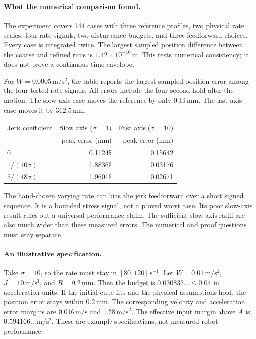 \documentclass[11pt]{article}
\begin{document}
\paragraph{What the numerical comparison found.}
The experiment covers 144 cases with three reference profiles, two physical rate scales, four rate signals, two disturbance budgets, and three feedforward choices. Every case is integrated twice. The largest sampled position difference between the coarse and refined runs is $1.42\times10^{-10}\,\mathrm m$.
This tests numerical consistency; it does not prove a continuous-time envelope.

For $W=0.0005\,\mathrm{m/s^2}$, the table reports the largest sampled position error among the four tested rate signals. All errors include the four-second hold after the motion.
The slow-axis case moves the reference by only $0.16\,\mathrm{mm}$.
The fast-axis case moves it by $312.5\,\mathrm{mm}$.
\begin{center}
\begin{tabular}{lrr}
\toprule
Jerk coefficient & Slow axis ($\sigma=1$) & Fast axis ($\sigma=10$)\\
 & peak error (mm) & peak error (mm)\\
\midrule
$0$ & 0.11245 & 0.15642\\
$1/(10\sigma)$ & 1.88368 & 0.03176\\
$5/(48\sigma)$ & 1.96018 & 0.02671\\
\bottomrule
\end{tabular}
\end{center}
The hand-chosen varying rate can bias the jerk feedforward over a short signed sequence. It is a bounded stress signal, not a proved worst case. Its poor slow-axis result rules out a universal performance claim. The sufficient slow-axis radii are also much wider than these measured errors. The numerical and proof questions must stay separate.

\paragraph{An illustrative specification.}
Take $\sigma=10$, so the rate must stay in $[80,120]\,\mathrm{s}^{-1}$.
Let $W=0.01\,\mathrm{m/s^2}$, $J=10\,\mathrm{m/s^3}$, and $R=0.2\,\mathrm{mm}$.
Then the budget is $0.030833\ldots\le0.04$ in acceleration units.
If the initial cube fits and the physical assumptions hold, the position error stays within $0.2\,\mathrm{mm}$.
The corresponding velocity and acceleration error margins are $0.016\,\mathrm{m/s}$ and $1.28\,\mathrm{m/s^2}$.
The effective input margin above $A$ is $0.594166\ldots\,\mathrm{m/s^2}$.
These are example specifications, not measured robot performance.
\end{document}
